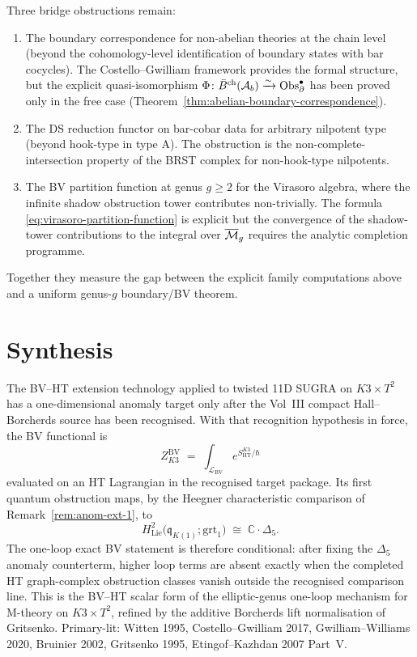 \begin{remark}
Three bridge obstructions remain:
\begin{enumerate}
\item The boundary correspondence for non-abelian theories at the
 chain level (beyond the cohomology-level identification of boundary
 states with bar cocycles). The Costello--Gwilliam framework provides
 the formal structure, but the explicit quasi-isomorphism
 $\Phi \colon \bar{B}^{\mathrm{ch}}(\mathcal{A}_b) \xrightarrow{\sim} \operatorname{Obs}^\bullet_\partial$
 has been proved only in the free case
 (Theorem~\ref{thm:abelian-boundary-correspondence}).
\item The DS reduction functor on bar-cobar data for arbitrary nilpotent
 type (beyond hook-type in type A). The obstruction is the
 non-complete-intersection property of the BRST complex for
 non-hook-type nilpotents.
\item The BV partition function at genus $g \geq 2$ for the Virasoro
 algebra, where the infinite shadow obstruction tower contributes non-trivially.
 The formula \eqref{eq:virasoro-partition-function} is explicit but the
 convergence of the shadow-tower contributions to the integral over
 $\overline{\mathcal{M}}_g$ requires the analytic completion programme.
\end{enumerate}
Together they measure the gap between the explicit family computations
above and a uniform genus-$g$ boundary/BV theorem.
\end{remark}

\section{Synthesis}
\label{sec:bvht-ext-supplement}

\begin{remark}
\label{rem:bvht-ext-1}
The BV--HT extension technology applied to twisted 11D SUGRA on
$K3\times T^2$ has a one-dimensional anomaly target only after the
Vol~III compact Hall--Borcherds source has been recognised.  With that
recognition hypothesis in force, the BV functional is
\[
Z^{\mathrm{BV}}_{K3} \;=\;
\int_{\mathcal L_{\mathrm{BV}}} e^{S_{\mathrm{HT}}^{K3}/\hbar}
\]
evaluated on an HT Lagrangian in the recognised target package.  Its
first quantum obstruction maps, by the Heegner characteristic comparison
of Remark~\ref{rem:anom-ext-1}, to
\[
H^2_{\mathrm{Lie}}\bigl(\mathfrak q_{K(1)};\mathrm{grt}_1\bigr)
\;\cong\; \mathbb C\cdot\Delta_5 .
\]
The one-loop exact BV statement is therefore conditional: after fixing
the $\Delta_5$ anomaly counterterm, higher loop terms are absent exactly
when the completed HT graph-complex obstruction classes vanish outside
the recognised comparison line.  This is the BV--HT scalar form of the
elliptic-genus one-loop mechanism for M-theory on $K3\times T^2$,
refined by the additive Borcherds lift normalisation of Gritsenko.
Primary-lit: Witten 1995, Costello--Gwilliam 2017,
Gwilliam--Williams 2020, Bruinier 2002, Gritsenko 1995,
Etingof--Kazhdan 2007 Part~V.
\end{remark}
